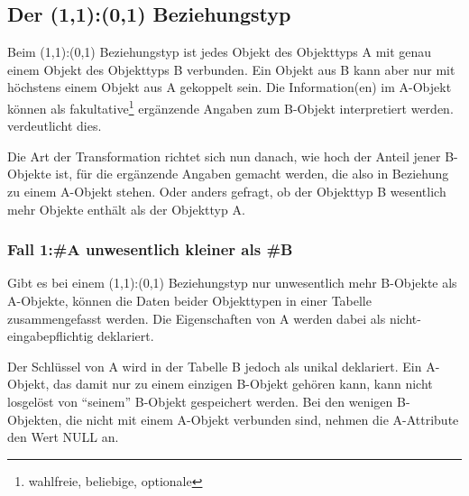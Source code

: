 \subsection{Der (1,1):(0,1) Beziehungstyp}
Beim (1,1):(0,1) Beziehungstyp ist jedes Objekt des Objekttyps A mit genau einem Objekt des Objekttyps B verbunden. Ein Objekt aus B kann aber nur mit höchstens einem Objekt aus A gekoppelt sein. Die Information(en) im A-Objekt können als fakultative\footnote{wahlfreie, beliebige, optionale} ergänzende Angaben zum B-Objekt interpretiert werden.  verdeutlicht dies.

\begin{center}
    \label{rel1101}
\end{center}

Die Art der Transformation richtet sich nun danach, wie hoch der Anteil jener B-Objekte ist, für die ergänzende Angaben gemacht werden, die also in Beziehung zu einem A-Objekt stehen. Oder anders gefragt, ob der Objekttyp B wesentlich mehr Objekte enthält als der Objekttyp A.
\subsubsection{Fall 1:\#A unwesentlich kleiner als \#B}
Gibt es bei einem (1,1):(0,1) Beziehungstyp nur unwesentlich mehr B-Objekte als A-Objekte, können die Daten beider Objekttypen in einer Tabelle zusammengefasst werden. Die Eigenschaften von A werden dabei als nicht-eingabepflichtig deklariert.

Der Schlüssel  von A wird in der Tabelle B jedoch als unikal deklariert. Ein A-Objekt, das damit nur zu einem einzigen B-Objekt gehören kann, kann nicht losgelöst von \enquote{seinem} B-Objekt gespeichert werden. Bei den wenigen B-Objekten, die nicht mit einem A-Objekt verbunden sind, nehmen die A-Attribute den Wert NULL an.
